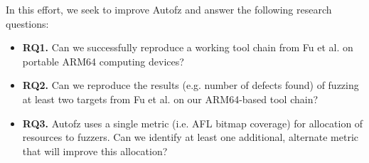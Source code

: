 In this effort, we seek to improve Autofz and answer the following research questions:
\begin{itemize}
    \item \textbf{RQ1.} Can we successfully reproduce a working tool chain from
    Fu et al. \cite{fu_autofz_2023} on portable ARM64 computing devices?
    \item \textbf{RQ2.} Can we reproduce the results (e.g. number of defects found)
     of fuzzing at least two targets from Fu et al. \cite{fu_autofz_2023} on our ARM64-based
      tool chain?
    \item \textbf{RQ3.} Autofz uses a single metric (i.e. AFL bitmap coverage) for
     allocation of resources to fuzzers. Can we identify at least one additional,
     alternate metric that will improve this allocation?
\end{itemize}
